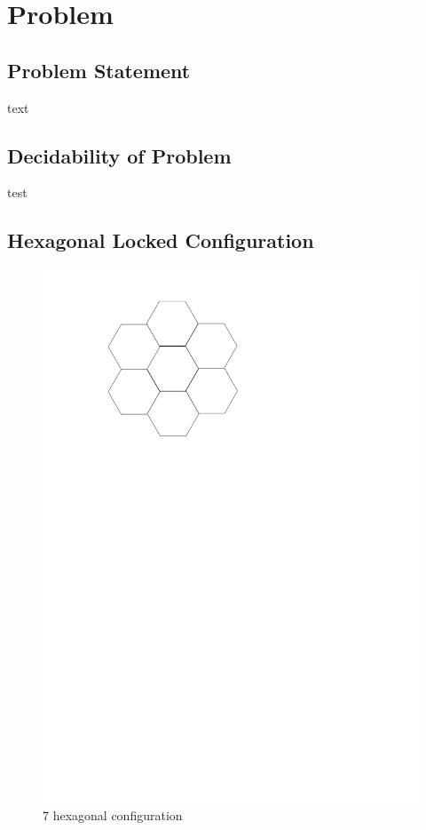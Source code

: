 \section{Problem}
\subsection{Problem Statement} text
\subsection{Decidability of Problem} test
\subsection{Hexagonal Locked Configuration}
\begin{figure}[ht]
\begin{center}
\includegraphics[scale=.33]{graphics/7hexLocked.pdf}
\caption{7 hexagonal configuration}
\label{figure:7hexLockedwithHingePoints}
\end{center} 
\end{figure}
\newpage